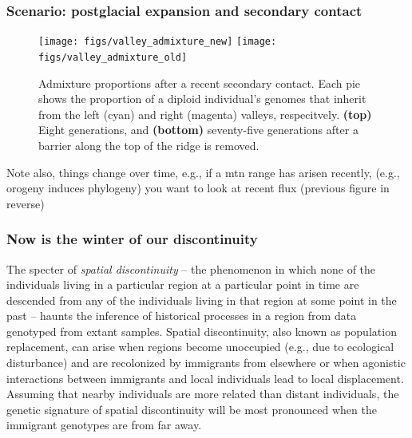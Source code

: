 \documentclass{ar-1col}
\newcommand{\g}[1]{{\color{blue}{#1}}}
\newcommand{\todo}[1]{{\textbf{\color{red}{#1}}}}
\begin{document}
\todo{read through and edit}

\subsubsection{Scenario: postglacial expansion and secondary contact}

\todo{How much does each individual inherit from each glacial refugium? Relate to admixture}

\g{to do}
\begin{figure}[ht]
    \centering
        \texttt{[image: figs/valley\_admixture\_new]}
        \texttt{[image: figs/valley\_admixture\_old]}
        \caption{
            Admixture proportions after a recent secondary contact.
            Each pie shows the proportion of a diploid individual's genomes
            that inherit from the left (cyan) and right (magenta) valleys, respecitvely.
            \textbf{(top)} Eight generations, and
            \textbf{(bottom)} seventy-five generations 
            after a barrier along the top of the ridge is removed.
        }
        \label{postglacial_expansion}
\end{figure}

Note also,
things change over time, e.g., if a mtn range has arisen recently, 
(e.g., orogeny induces phylogeny)
you want to look at recent flux (previous figure in reverse)

\subsubsection{Now is the winter of our discontinuity}

The specter of \textit{spatial discontinuity} --
the phenomenon in which none of the individuals 
living in a particular region at a particular point in time 
are descended from any of the individuals living in that region 
at some point in the past
-- haunts the inference of historical processes in a region 
from data genotyped from extant samples.
Spatial discontinuity, 
also known as population replacement, 
can arise when regions become unoccupied
(e.g., due to ecological disturbance) 
and are recolonized by immigrants from elsewhere or 
when agonistic interactions between immigrants and local individuals 
lead to local displacement. 
Assuming that nearby individuals are more related than distant individuals, 
the genetic signature of spatial discontinuity will be most pronounced 
when the immigrant genotypes are from far away.
\end{document}
